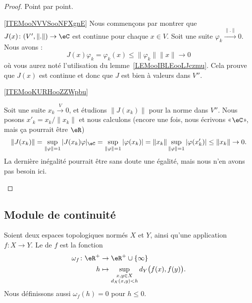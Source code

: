 \begin{proof}
    Point par point.
    \begin{subproof}
        \item[\ref{ITEMooNVVSooNFXgnE}]
            Nous commençons par montrer que \( J(x)\colon (V',\| . \|)\to \eC\) est continue pour chaque \( x\in V\). Soit une suite \( \varphi_k\stackrel{\| . \|}{\longrightarrow}0\). Nous avons :
            \begin{equation}
                J(x)\varphi_k=\varphi_k(x)\leq \| \varphi_k \|\| x \|\to 0
            \end{equation}
            où vous aurez noté l'utilisation du lemme~\ref{LEMooIBLEooLJczmu}.  Cela prouve que \( J(x)\) est continue et donc que \( J\) est bien à valeurs dans \( V''\).
        \item[\ref{ITEMooKURHooZZWpbu}]

            Soit une suite \( x_k\stackrel{V}{\longrightarrow}0\), et étudions \( \| J(x_k) \|\) pour la norme dans \( V''\). Nous posons \( x'_k=x_k/\| x_k \|\) et nous calculons (encore une fois, nous écrivons «\( \eC\)», mais ça pourrait être \( \eR\))
            \begin{equation}
                \| J(x_k) \|=\sup_{\| \varphi \|=1}| J(x_k)\varphi |_{\eC}=\sup_{\| \varphi \|=1}| \varphi(x_k) |=\| x_k \|\sup_{\| \varphi \|=1}| \varphi(x'_k) |\leq \| x_k \|\to 0.
            \end{equation}
            La dernière inégalité pourrait être sans doute une égalité, mais nous n'en avons pas besoin ici.
    \end{subproof}
\end{proof}

\subsection{Module de continuité}

\begin{definition}
    Soient deux espaces topologiques normés \( X\) et \( Y\),  ainsi qu'une application \( f\colon X\to Y\). Le  de \( f\) est la fonction
    \begin{equation}
        \begin{aligned}
            \omega_f\colon \eR^+&\to \eR^+\cup\{ \infty \} \\
            h&\mapsto\sup_{\substack{x,y\in X\\d_X(x,y)< h}} d_Y\big( f(x),f(y) \big).
        \end{aligned}
    \end{equation}
    Nous définissons aussi \( \omega_f(h)=0\) pour \( h\leq 0\).
\end{definition}

